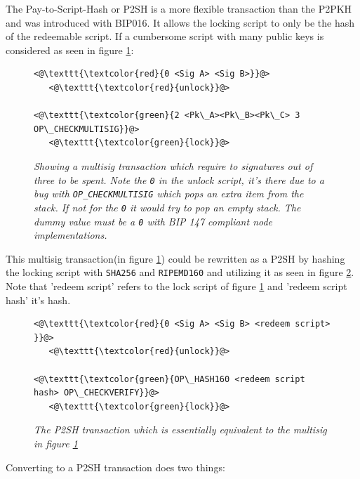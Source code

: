 The Pay-to-Script-Hash or P2SH is a more flexible transaction than the P2PKH and was introduced with BIP016\cite{bip:0016:p2sh}. It allows the locking script to only be the hash of the redeemable script. If a cumbersome script with many public keys is considered as seen in figure \ref{fig:cumbersome:script}:

\begin{figure}
	
	\begin{lstlisting}
<@\texttt{\textcolor{red}{0 <Sig A> <Sig B>}}@>   
   <@\texttt{\textcolor{red}{unlock}}@>
	
<@\texttt{\textcolor{green}{2 <Pk\_A><Pk\_B><Pk\_C> 3 OP\_CHECKMULTISIG}}@>
   <@\texttt{\textcolor{green}{lock}}@>
	\end{lstlisting}
	
	\caption{\textit{ Showing a multisig transaction which require to signatures out of three to be spent. Note the \texttt{0} in the unlock script, it's there due to a bug with \texttt{OP\_CHECKMULTISIG} which pops an extra item from the stack. If not for the \texttt{0} it would try to pop an empty stack. The dummy value must be a \texttt{0} with BIP 147 compliant node implementations\cite{bip:0147:dummy:zero}.
	}}
	\label{fig:cumbersome:script}
\end{figure} 

This multisig transaction(in figure \ref{fig:cumbersome:script}) could be rewritten as a P2SH by hashing the locking script with \texttt{SHA256} and  \texttt{RIPEMD160} and utilizing it as seen in figure \ref{fig:p2sh}. Note that 'redeem script' refers to the lock script of figure \ref{fig:cumbersome:script} and 'redeem script hash' it's hash.

\begin{figure}[hbt!]
	
	\begin{lstlisting}
<@\texttt{\textcolor{red}{0 <Sig A> <Sig B> <redeem script> }}@>   
   <@\texttt{\textcolor{red}{unlock}}@>
	
<@\texttt{\textcolor{green}{OP\_HASH160 <redeem script hash> OP\_CHECKVERIFY}}@>
   <@\texttt{\textcolor{green}{lock}}@>
	\end{lstlisting}
	
	\caption{\textit{ The P2SH transaction which is essentially equivalent to the multisig in figure \ref{fig:cumbersome:script}
	}}
	\label{fig:p2sh}
\end{figure}

Converting to a P2SH transaction does two things:

